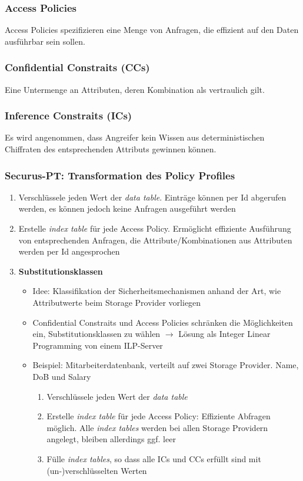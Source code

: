 \subsubsection{Access Policies} 
Access Policies spezifizieren eine Menge von Anfragen, die effizient auf den Daten ausführbar sein sollen.

\subsubsection{Confidential Constraits (CCs)}
Eine Untermenge an Attributen, deren Kombination als vertraulich gilt.

\subsubsection{Inference Constraits (ICs)}
Es wird angenommen, dass Angreifer kein Wissen aus deterministischen Chiffraten des entsprechenden Attributs gewinnen können.

\subsubsection{Securus-PT: Transformation des Policy Profiles}
\begin{enumerate}
	\item Verschlüssele jeden Wert der \textit{data table}. Einträge können per Id abgerufen werden, es können jedoch keine Anfragen ausgeführt werden
	\item Erstelle \textit{index table} für jede Access Policy. Ermöglicht effiziente Ausführung von entsprechenden Anfragen, die Attribute/Kombinationen aus Attributen werden per Id angesprochen
	\item \textbf{Substitutionsklassen}
	\begin{itemize}
		\item Idee: Klassifikation der Sicherheitsmechanismen anhand der Art, wie Attributwerte beim Storage Provider vorliegen
		\item Confidential Constraits und Access Policies schränken die Möglichkeiten ein, Substitutionsklassen zu wählen $\rightarrow$ Lösung als Integer Linear Programming von einem ILP-Server
		\item Beispiel: Mitarbeiterdatenbank, verteilt auf zwei Storage Provider. Name, DoB und Salary
		\begin{enumerate}
			\item Verschlüssele jeden Wert der \textit{data table}
			\item Erstelle \textit{index table} für jede Access Policy: Effiziente Abfragen möglich. Alle \textit{index tables} werden bei allen Storage Providern angelegt, bleiben allerdings ggf. leer
			\item Fülle \textit{index tables}, so dass alle ICs und CCs erfüllt sind mit (un-)verschlüsselten Werten
		\end{enumerate}
	\end{itemize}
\end{enumerate}

